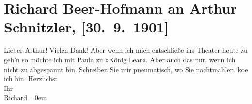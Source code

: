 

         
         \renewcommand{\erwaehntePersonen}{Personen: Paula Beer-Hofmann}
         \renewcommand{\erwaehnteOrte}{Orte: Wien}
         \renewcommand{\erwaehnteWerke}{Werke: König Lear}
               \section[Richard Beer-Hofmann an Arthur Schnitzler, {[}30. 9. 1901{]}]{ Richard Beer-Hofmann an Arthur Schnitzler, {[}30. 9. 1901{]}}\nopagebreak{}\rehead{ }\begin{ledgroupsized}[t]{13cm}\normalsize\beginnumbering \toendnotes[C]{\smallbreak\pagebreak[2]} 
\toendnotes[C]{\smallbreak}\pstart
           \noindent{}{\pb}Lieber Arthur! Vielen Dank! Aber wenn ich mich entschließe ins
               Theater heute zu geh’n so möchte ich mit Paula
               zu »König Lear«. Aber auch das nur, wenn ich
               nicht zu abgespannt bin. Schreiben Sie mir pneumatisch, wo Sie nachtmahlen.  ko{\geminationm}e ich hin.\pend
           \pstart
           Herzlichst{\\[\baselineskip]}Ihr{\\[\baselineskip]}\spacefill\mbox{Richard}\pend
           \leftskip=0em{}
         
         \endnumbering{}\end{ledgroupsized}  \newcommand{\dateiname}{L01177}\newcommand{\titel}{Richard Beer-Hofmann an Arthur Schnitzler, [30. 9. 1901]}\newcommand{\editorInnen}{Martin Anton Müller und Gerd-Hermann Susen}
      